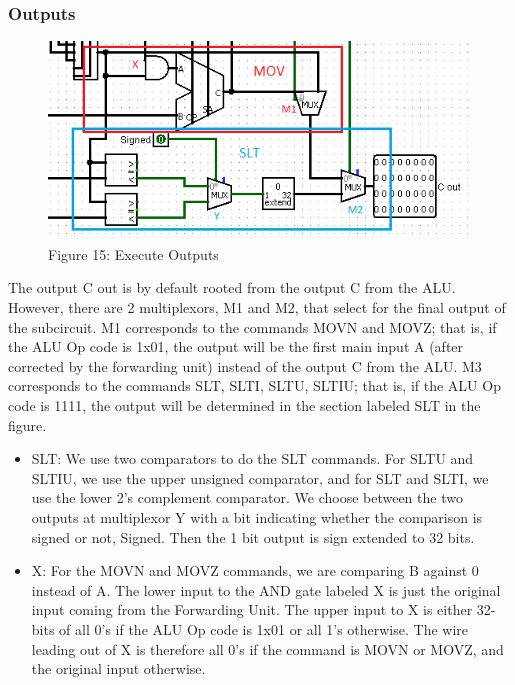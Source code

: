 \documentclass{article}
\begin{document}
\subsubsection{Outputs}
\begin{figure}
\vspace{-1cm}
\begin{center}
\includegraphics[scale = 0.8]{OUTPUT.png} \\
Figure 15: Execute Outputs
\end{center}
\vspace{-0.5cm}
\end{figure}
The output C out is by default rooted from the output C from the ALU. However, there are 2 multiplexors, M1 and M2, that select for the final output of the subcircuit. M1 corresponds to the commands MOVN and MOVZ; that is, if the ALU Op code is 1x01, the output will be the first main input A (after corrected by the forwarding unit) instead of the output C from the ALU. M3 corresponds to the commands SLT, SLTI, SLTU, SLTIU; that is, if the ALU Op code is 1111, the output will be determined in the section labeled SLT in the figure. 
\begin{itemize}
\item
SLT: We use two comparators to do the SLT commands. For SLTU and SLTIU, we use the upper unsigned comparator, and for SLT and SLTI, we use the lower 2's complement comparator. We choose between the two outputs at multiplexor Y with a bit indicating whether the comparison is signed or not, Signed. Then the 1 bit output is sign extended to 32 bits. 

\item
X: For the MOVN and MOVZ commands, we are comparing B against 0 instead of A. The lower input to the AND gate labeled X is just the original input coming from the Forwarding Unit. The upper input to X is either 32-bits of all 0's if the ALU Op code is 1x01 or all 1's otherwise. The wire leading out of X is therefore all 0's if the command is MOVN or MOVZ, and the original input otherwise.

\end{itemize}
\end{document}
